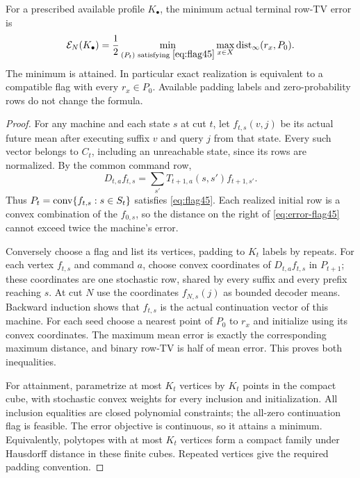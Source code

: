 \begin{theorem}\label{thm:flag45}
For a prescribed available profile $K_\bullet$, the minimum actual terminal row-TV error is
\begin{equation}\label{eq:error-flag45}
 \mathcal E_N(K_\bullet)
 =\frac12\min_{(P_t)\text{ satisfying }\eqref{eq:flag45}}
      \max_{x\in X}\operatorname{dist}_\infty(r_x,P_0).
\end{equation}
The minimum is attained. In particular exact realization is equivalent to a compatible flag with every $r_x\in P_0$. Available padding labels and zero-probability rows do not change the formula.
\end{theorem}
\begin{proof}
For any machine and each state $s$ at cut $t$, let $f_{t,s}(v,j)$ be its actual future mean after executing suffix $v$ and query $j$ from that state. Every such vector belongs to $C_t$, including an unreachable state, since its rows are normalized. By the common command row,
\[
 D_{t,a}f_{t,s}=\sum_{s'}T_{t+1,a}(s,s')f_{t+1,s'}.
\]
Thus $P_t=\operatorname{conv}\{f_{t,s}:s\in S_t\}$ satisfies \eqref{eq:flag45}. Each realized initial row is a convex combination of the $f_{0,s}$, so the distance on the right of \eqref{eq:error-flag45} cannot exceed twice the machine's error.

Conversely choose a flag and list its vertices, padding to $K_t$ labels by repeats. For each vertex $f_{t,s}$ and command $a$, choose convex coordinates of $D_{t,a}f_{t,s}$ in $P_{t+1}$; these coordinates are one stochastic row, shared by every suffix and every prefix reaching $s$. At cut $N$ use the coordinates $f_{N,s}(j)$ as bounded decoder means. Backward induction shows that $f_{t,s}$ is the actual continuation vector of this machine. For each seed choose a nearest point of $P_0$ to $r_x$ and initialize using its convex coordinates. The maximum mean error is exactly the corresponding maximum distance, and binary row-TV is half of mean error. This proves both inequalities.

For attainment, parametrize at most $K_t$ vertices by $K_t$ points in the compact cube, with stochastic convex weights for every inclusion and initialization. All inclusion equalities are closed polynomial constraints; the all-zero continuation flag is feasible. The error objective is continuous, so it attains a minimum. Equivalently, polytopes with at most $K_t$ vertices form a compact family under Hausdorff distance in these finite cubes. Repeated vertices give the required padding convention.
\end{proof}

